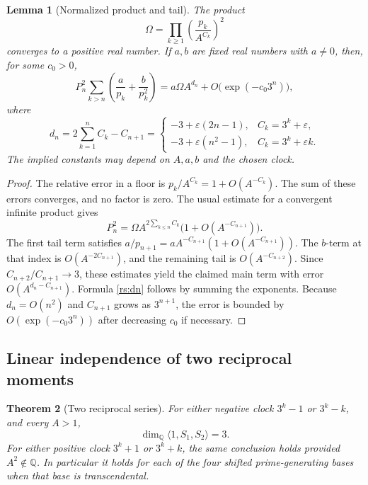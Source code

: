\documentclass[11pt,a4paper]{article}
\numberwithin{equation}{section}
\newtheorem{theorem}{Theorem}[section]
\newtheorem{lemma}[theorem]{Lemma}
\theoremstyle{definition}
\theoremstyle{remark}
\newcommand{\Q}{\mathbb Q}
\begin{document}
\begin{lemma}[Normalized product and tail]\label{rs:tail}
The product
\[
 \Omega=\prod_{k\ge1}\left(\frac{p_k}{A^{C_k}}\right)^2
\]
converges to a positive real number.  If $a,b$ are fixed real numbers
with $a\ne0$, then, for some $c_0>0$,
\begin{equation}\label{rs:integer-asymptotic}
 P_n^2\sum_{k>n}\left(\frac a{p_k}+\frac b{p_k^2}\right)
 =a\Omega A^{d_n}+O\bigl(\exp(-c_0 3^n)\bigr),
\end{equation}
where
\begin{equation}\label{rs:dn}
 d_n=2\sum_{k=1}^n C_k-C_{n+1}
 =\begin{cases}
 -3+\varepsilon(2n-1),&C_k=3^k+\varepsilon,\\
 -3+\varepsilon(n^2-1),&C_k=3^k+\varepsilon k.
 \end{cases}
\end{equation}
The implied constants may depend on $A,a,b$ and the chosen clock.
\end{lemma}

\begin{proof}
The relative error in a floor is
$p_k/A^{C_k}=1+O(A^{-C_k})$.  The sum of these errors converges, and no
factor is zero.  The usual estimate for a convergent infinite product gives
\[
 P_n^2=\Omega A^{2\sum_{k\le n}C_k}
       \bigl(1+O(A^{-C_{n+1}})\bigr).
\]
The first tail term satisfies
$a/p_{n+1}=aA^{-C_{n+1}}(1+O(A^{-C_{n+1}}))$.
The $b$-term at that index is $O(A^{-2C_{n+1}})$, and the remaining
tail is $O(A^{-C_{n+2}})$.  Since $C_{n+2}/C_{n+1}\to3$, these estimates
yield the claimed main term with error $O(A^{d_n-C_{n+1}})$.
Formula \eqref{rs:dn} follows by summing the exponents.  Because
$d_n=O(n^2)$ and $C_{n+1}$ grows as $3^{n+1}$, the error is bounded
by $O(\exp(-c_0 3^n))$ after decreasing $c_0$ if necessary.
\end{proof}

\subsection{Linear independence of two reciprocal moments}

\begin{theorem}[Two reciprocal series]\label{rs:independence}
For either negative clock $3^k-1$ or $3^k-k$, and every $A>1$,
\[
 \dim_{\Q}\langle 1,S_1,S_2\rangle=3.
\]
For either positive clock $3^k+1$ or $3^k+k$, the same conclusion holds
provided $A^2\notin\Q$.  In particular it holds for each of the four
shifted prime-generating bases when that base is transcendental.
\end{theorem}
\end{document}
